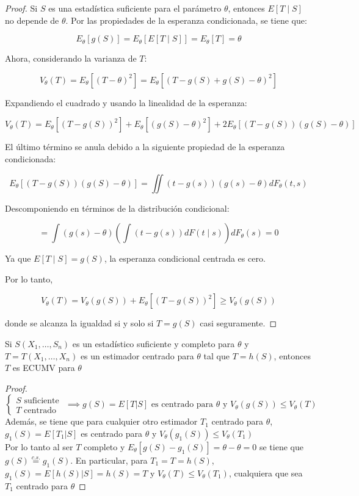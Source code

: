 \begin{proof}
  Si $S$ es una estadística suficiente para el parámetro $\theta$, entonces $E[T \mid S]$ no depende de $\theta$. Por las propiedades de la esperanza condicionada, se tiene que:

  \[
  E_{\theta}[g(S)] = E_{\theta}[E[T \mid S]] = E_{\theta}[T] = \theta
  \]

  Ahora, considerando la varianza de $T$:

  \[
  V_{\theta}(T) = E_{\theta}[(T - \theta)^2] = E_{\theta}[(T - g(S) + g(S) - \theta)^2]
  \]

  Expandiendo el cuadrado y usando la linealidad de la esperanza:

  \[
  V_{\theta}(T) = E_{\theta}[(T - g(S))^2] + E_{\theta}[(g(S) - \theta)^2] + 2E_{\theta}[(T - g(S))(g(S) - \theta)]
  \]

  El último término se anula debido a la siguiente propiedad de la esperanza condicionada:

  \[
  E_{\theta}[(T - g(S))(g(S) - \theta)] = \iint (t - g(s))(g(s) - \theta) dF_{\theta}(t, s)
  \]

  Descomponiendo en términos de la distribución condicional:

  \[
  = \int (g(s) - \theta) \left( \int (t - g(s)) dF(t \mid s) \right) dF_{\theta}(s) = 0
  \]

  Ya que $E[T \mid S] = g(S)$, la esperanza condicional centrada es cero.

  Por lo tanto,

  \[
  V_{\theta}(T) = V_{\theta}(g(S)) + E_{\theta}[(T - g(S))^2] \geq V_{\theta}(g(S))
  \]

  donde se alcanza la igualdad si y solo si $T = g(S)$ casi seguramente.
\end{proof}


\begin{teorema}
  Si $S(X_1, \ldots, S_n)$ es un estadístico suficiente y completo para $\theta$ y $T = T(X_1, \ldots, X_n)$ es un estimador centrado para $\theta$ tal que $T = h(S)$, entonces $T$ es ECUMV para $\theta$
\end{teorema}

\begin{proof}
  $\begin{cases} S \text{ suficiente } \\ T \text{ centrado } \end{cases} \implies g(S) = E[T|S] \text{ es centrado para } \theta \text{ y } V_{\theta}(g(S)) \leq V_{\theta}(T)$ \\
  Además, se tiene que para cualquier otro estimador $T_1$ centrado para $\theta$, $g_1(S) = E[T_1 | S]$ es centrado para $\theta$ y $V_{\theta}(g_1(S)) \leq V_{\theta}(T_1)$ \\
  Por lo tanto al ser $T$ completo y $E_{\theta}[g(S) - g_1(S)] = \theta - \theta = 0$ se tiene que $g(S) \stackrel{c.s.}{=} g_1(S)$. En particular, para $T_1 = T = h(S)$, $g_1(S) = E[h(S) | S] = h(S) = T$ y $V_{\theta}(T) \leq V_{\theta}(T_1)$, cualquiera que sea $T_1$ centrado para $\theta$
\end{proof}

